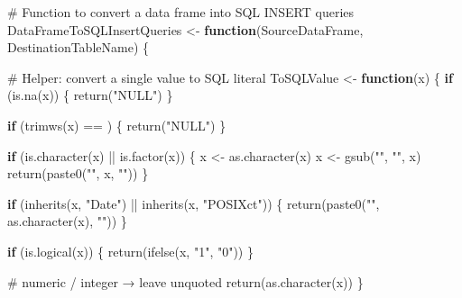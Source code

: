 \documentclass[
  letterpaper,
  DIV=11,
  numbers=noendperiod]{scrreprt}
\newenvironment{Shaded}{\begin{snugshade}}{\end{snugshade}}
\newcommand{\CommentTok}[1]{\textcolor[rgb]{0.37,0.37,0.37}{#1}}
\newcommand{\ControlFlowTok}[1]{\textcolor[rgb]{0.00,0.23,0.31}{\textbf{#1}}}
\newcommand{\FunctionTok}[1]{\textcolor[rgb]{0.28,0.35,0.67}{#1}}
\newcommand{\NormalTok}[1]{\textcolor[rgb]{0.00,0.23,0.31}{#1}}
\newcommand{\OtherTok}[1]{\textcolor[rgb]{0.00,0.23,0.31}{#1}}
\newcommand{\SpecialCharTok}[1]{\textcolor[rgb]{0.37,0.37,0.37}{#1}}
\newcommand{\StringTok}[1]{\textcolor[rgb]{0.13,0.47,0.30}{#1}}
\begin{document}
\begin{Shaded}
\begin{Highlighting}[]
\CommentTok{\# Function to convert a data frame into SQL INSERT queries}
\NormalTok{DataFrameToSQLInsertQueries }\OtherTok{\textless{}{-}} \ControlFlowTok{function}\NormalTok{(SourceDataFrame, DestinationTableName) \{}
  
  \CommentTok{\# Helper: convert a single value to SQL literal}
\NormalTok{  ToSQLValue }\OtherTok{\textless{}{-}} \ControlFlowTok{function}\NormalTok{(x) \{}
    \ControlFlowTok{if}\NormalTok{ (}\FunctionTok{is.na}\NormalTok{(x)) \{}
      \FunctionTok{return}\NormalTok{(}\StringTok{"NULL"}\NormalTok{)}
\NormalTok{    \}}
    
    \ControlFlowTok{if}\NormalTok{ (}\FunctionTok{trimws}\NormalTok{(x) }\SpecialCharTok{==} \StringTok{\textquotesingle{}\textquotesingle{}}\NormalTok{) \{}
      \FunctionTok{return}\NormalTok{(}\StringTok{"NULL"}\NormalTok{)}
\NormalTok{    \}}
    
    \ControlFlowTok{if}\NormalTok{ (}\FunctionTok{is.character}\NormalTok{(x) }\SpecialCharTok{||} \FunctionTok{is.factor}\NormalTok{(x)) \{}
\NormalTok{      x }\OtherTok{\textless{}{-}} \FunctionTok{as.character}\NormalTok{(x)}
\NormalTok{      x }\OtherTok{\textless{}{-}} \FunctionTok{gsub}\NormalTok{(}\StringTok{"\textquotesingle{}"}\NormalTok{, }\StringTok{"\textquotesingle{}\textquotesingle{}"}\NormalTok{, x)}
      \FunctionTok{return}\NormalTok{(}\FunctionTok{paste0}\NormalTok{(}\StringTok{"\textquotesingle{}"}\NormalTok{, x, }\StringTok{"\textquotesingle{}"}\NormalTok{))}
\NormalTok{    \}}
    
    \ControlFlowTok{if}\NormalTok{ (}\FunctionTok{inherits}\NormalTok{(x, }\StringTok{"Date"}\NormalTok{) }\SpecialCharTok{||} \FunctionTok{inherits}\NormalTok{(x, }\StringTok{"POSIXct"}\NormalTok{)) \{}
      \FunctionTok{return}\NormalTok{(}\FunctionTok{paste0}\NormalTok{(}\StringTok{"\textquotesingle{}"}\NormalTok{, }\FunctionTok{as.character}\NormalTok{(x), }\StringTok{"\textquotesingle{}"}\NormalTok{))}
\NormalTok{    \}}
    
    \ControlFlowTok{if}\NormalTok{ (}\FunctionTok{is.logical}\NormalTok{(x)) \{}
      \FunctionTok{return}\NormalTok{(}\FunctionTok{ifelse}\NormalTok{(x, }\StringTok{"1"}\NormalTok{, }\StringTok{"0"}\NormalTok{))}
\NormalTok{    \}}
    
    \CommentTok{\# numeric / integer → leave unquoted}
    \FunctionTok{return}\NormalTok{(}\FunctionTok{as.character}\NormalTok{(x))}
\NormalTok{  \}}
  

\end{Highlighting}
\end{Shaded}
\end{document}
